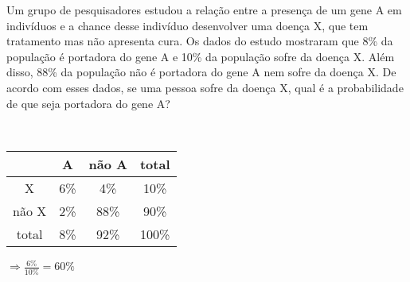 \begin{ex}
Um grupo de pesquisadores estudou a relação entre a presença de um gene A em indivíduos e a chance desse indivíduo desenvolver uma doença X, que tem tratamento mas não apresenta cura. Os dados do estudo mostraram que 8\% da população é portadora do gene A e 10\% da população sofre da doença X. Além disso, 88\% da população não é portadora do gene A nem sofre da doença X. De acordo com esses dados, se uma pessoa sofre da doença X, qual é a probabilidade de que seja portadora do gene A?
  \begin{sol}
    \phantom{A} \\
    \begin{tabular}{|c|c|c|c|} \hline
         & A & não A & total   \\ \hline
        X & 6\% & 4\% & 10\% \\  \hline
     não X& 2\% & 88\% & 90\% \\ \hline
     total& 8\% & 92\% &100\%  \\ \hline
     
    \end{tabular}
    $\Longrightarrow \frac{6\%}{10\%}=60\%$
  \end{sol}
\end{ex}